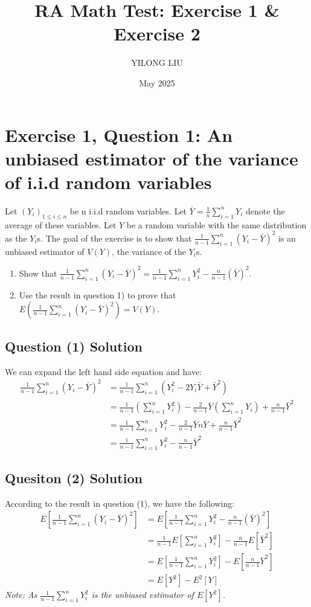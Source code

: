 \documentclass{article}
\title{RA Math Test: Exercise 1 \& Exercise 2}
\author{YILONG LIU}
\date{May 2025}
\begin{document}
\maketitle

\section{Exercise 1, Question 1: An unbiased estimator of the variance of i.i.d random variables}
Let $(Y_i)_{1\leq i \leq n}$ be n i.i.d random variables. Let $\bar{Y} = \frac{1}{n} \sum^n_{i=1}{Y_i}$ denote the average of these variables. Let $Y$ be a random variable with the same distribution as the $Y_i$s. The goal of the exercise is to show that $\frac{1}{n-1} \sum^n_{i=1}{(Y_i - \bar{Y})^2}$ is an unbiased estimator of $V(Y)$, the variance of the $Y_i$s.
\begin{enumerate}[label=(\arabic*), leftmargin=*, align=left]
    \item Show that 
    $\frac{1}{n-1} \sum^n_{i=1} (Y_i - \bar{Y})^2 = \frac{1}{n-1}\sum^n_{i=1}{Y^2_i}-\frac{n}{n-1}(\bar{Y})^2$.

    \item Use the result in question 1) to prove that 
    $E\left(\frac{1}{n-1} \sum^n_{i=1}(Y_i-\bar{Y})^2\right)=V(Y)$.
\end{enumerate}

\subsection{Question (1) Solution}
We can expand the left hand side equation and have:
\begin{align*}
\frac{1}{n-1} \sum^n_{i=1} (Y_i-\bar{Y})^2 &= \frac{1}{n-1}\sum^n_{i=1}(Y^2_i-2 Y_i \bar{Y}+\bar{Y}^2)
\\&=\frac{1}{n-1} (\sum^n_{i=1} Y^2_i) - \frac{2}{n-1}\bar{Y}(\sum^n_{i=1} Y_i)+\frac{n}{n-1}\bar{Y}^2
\\&=\frac{1}{n-1}\sum^n_{i=1}Y^2_i - \frac{2}{n-1}\bar{Y}{n \bar{Y}} + \frac{n}{n-1}\bar{Y}^2
\\&=\frac{1}{n-1} \sum^n_{i=1}Y^2_i - \frac{n}{n-1}\bar{Y}^2
\end{align*}

\subsection{Quesiton (2) Solution}
According to the result in question (1), we have the following:
\begin{align*}
E[\frac{1}{n-1}\sum^n_{i=1}(Y_i - \bar{Y})^2] &= E[\frac{1}{n-1} \sum^n_{i=1}Y^2_i - \frac{n}{n-1}(\bar{Y})^2]
\\&=\frac{1}{n-1}E[\sum^n_{i=1}Y^2_i] - \frac{n}{n-1}E[\bar{Y}^2]
\\&=E[\frac{1}{n-1}\sum^n_{i=1}Y^2_i]-E[\frac{n}{n-1}\bar{Y}^2]
\\&=E[Y^2] - E^2[Y]
\end{align*}
\textit{Note: As $\frac{1}{n-1} \sum^n_{i=1}Y^2_i$ is the unbiased estimator of $E[Y^2]$.}
\end{document}
